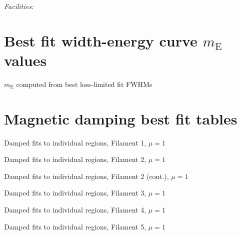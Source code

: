 \documentclass[iop, apj, numberedappendix]{emulateapj}
\newcommand*{\mt}{\mathrm}
\begin{document}
{\it Facilities:} 

\clearpage
\appendix

\setcounter{table}{0}
\renewcommand{\thetable}{A\arabic{table}}
\setcounter{figure}{0}
\renewcommand{\thefigure}{A\arabic{figure}}

\section{Best fit width-energy curve $m_\mt{E}$ values}

\begin{table*}[ht]
    \footnotesize
    \centering
    \caption{$m_\mt{E}$ computed from best loss-limited fit FWHMs}
    
\end{table*}

\clearpage
\section{Magnetic damping best fit tables}

\begin{table*}[ht]
    \scriptsize
    \centering
    \caption{Damped fits to individual regions, Filament 1, $\mu = 1$}
    
\end{table*}

\begin{table*}[ht]
    \scriptsize
    \centering
    \caption{Damped fits to individual regions, Filament 2, $\mu = 1$}
    
\end{table*}

\begin{table*}[ht]
    \scriptsize
    \centering
    \caption{Damped fits to individual regions, Filament 2 (cont.), $\mu = 1$}
    
\end{table*}

\begin{table*}[ht]
    \scriptsize
    \centering
    \caption{Damped fits to individual regions, Filament 3, $\mu = 1$}
    
\end{table*}

\begin{table*}[ht]
    \scriptsize
    \centering
    \caption{Damped fits to individual regions, Filament 4, $\mu = 1$}
    
\end{table*}

\begin{table*}[ht]
    \scriptsize
    \centering
    \caption{Damped fits to individual regions, Filament 5, $\mu = 1$}
    
\end{table*}
\end{document}
